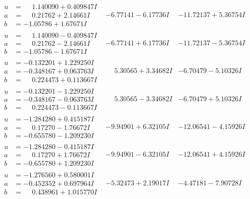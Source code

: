 \documentclass[1p]{elsarticle_modified}
\theoremstyle{definition}
\begin{document}
$$\begin{array}{c|c|c}
\begin{aligned}
u &= \phantom{-}1.140090 + 0.409847 I \\
a &= \phantom{-}0.21762 + 2.14661 I \\
b &= -1.05786 + 1.67671 I\end{aligned}
 & -6.77141 - 6.17736 I & -11.72137 + 5.36754 I \\ \hline\begin{aligned}
u &= \phantom{-}1.140090 - 0.409847 I \\
a &= \phantom{-}0.21762 - 2.14661 I \\
b &= -1.05786 - 1.67671 I\end{aligned}
 & -6.77141 + 6.17736 I & -11.72137 - 5.36754 I \\ \hline\begin{aligned}
u &= -0.132201 + 1.229250 I \\
a &= -0.348167 + 0.063763 I \\
b &= \phantom{-}0.224473 + 0.113667 I\end{aligned}
 & \phantom{-}5.30565 + 3.34682 I & -6.70479 - 5.10326 I \\ \hline\begin{aligned}
u &= -0.132201 - 1.229250 I \\
a &= -0.348167 - 0.063763 I \\
b &= \phantom{-}0.224473 - 0.113667 I\end{aligned}
 & \phantom{-}5.30565 - 3.34682 I & -6.70479 + 5.10326 I \\ \hline\begin{aligned}
u &= -1.284280 + 0.415187 I \\
a &= \phantom{-}0.17270 - 1.76672 I \\
b &= -0.655780 - 1.209230 I\end{aligned}
 & -9.94901 + 6.32105 I & -12.06541 - 4.15926 I \\ \hline\begin{aligned}
u &= -1.284280 - 0.415187 I \\
a &= \phantom{-}0.17270 + 1.76672 I \\
b &= -0.655780 + 1.209230 I\end{aligned}
 & -9.94901 - 6.32105 I & -12.06541 + 4.15926 I \\ \hline\begin{aligned}
u &= -1.276560 + 0.580001 I \\
a &= -0.452352 + 0.697964 I \\
b &= \phantom{-}0.438961 + 1.015770 I\end{aligned}
 & -5.32473 + 2.19017 I & -4.47181 - 7.90728 I \\ \hline\begin{aligned}

\end{aligned}
\end{array}$$
\end{document}
